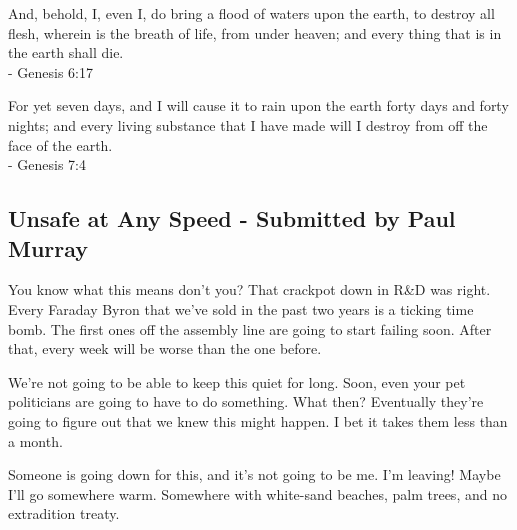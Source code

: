 \documentclass[12pt, a5paper, parskip=half-]{scrartcl}
\begin{document}
And, behold, I, even I, do bring a flood of waters upon the earth, to destroy all flesh, wherein is the breath of life, from under heaven; and every thing that is in the earth shall die. \\
\vspace{0.5ex}\hspace{8cm} - Genesis 6:17

For yet seven days, and I will cause it to rain upon the earth forty days and forty nights; and every living substance that I have made will I destroy from off the face of the earth.\\
\vspace{0.5ex}\hspace{8cm} - Genesis 7:4

\subsection*{Unsafe at Any Speed \setmainfont{URWClassico} - Submitted by Paul Murray} \label{subsection:unsafe-at-any-speed}
You know what this means don't you?
That crackpot down in R\&D was right. 
Every Faraday Byron that we've sold in the past two years is a ticking time bomb.
The first ones off the assembly line are going to start failing soon.
After that, every week will be worse than the one before.

We're not going to be able to keep this quiet for long.
Soon, even your pet politicians are going to have to do something.
What then?
Eventually they're going to figure out that we knew this might happen.
I bet it takes them less than a month.

Someone is going down for this, and it's not going to be me.
I'm leaving!
Maybe I'll go somewhere warm. 
Somewhere with white-sand beaches, palm trees,  and no extradition treaty.

\newpage
\end{document}

